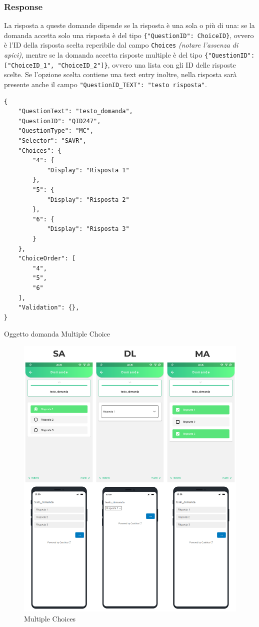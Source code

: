 \subsubsection{Response}
La risposta a queste domande dipende se la risposta è una sola o più di una: se la domanda accetta solo una risposta è del tipo \texttt{\{"QuestionID": ChoiceID\}}, ovvero è l'ID della risposta scelta reperibile dal campo \texttt{Choices} \textit{(notare l'assenza di apici)}, mentre se la domanda accetta risposte multiple è del tipo \texttt{\{"QuestionID": ["ChoiceID\_1", "ChoiceID\_2"]\}}, ovvero una lista con gli ID delle risposte scelte. Se l'opzione scelta contiene una text entry inoltre, nella risposta sarà presente anche il campo \texttt{"QuestionID\_TEXT": "testo risposta"}.

\begin{json}
\begin{verbatim}
{
    "QuestionText": "testo_domanda",
    "QuestionID": "QID247",
    "QuestionType": "MC",
    "Selector": "SAVR",
    "Choices": {
        "4": {
            "Display": "Risposta 1"
        },
        "5": {
            "Display": "Risposta 2"
        },
        "6": {
            "Display": "Risposta 3"
        }
    },
    "ChoiceOrder": [
        "4",
        "5",
        "6"
    ],
    "Validation": {},
}
\end{verbatim}
\caption{Oggetto domanda Multiple Choice}
\label{json:mc}
\end{json}

\begin{figure}[h!]
\centering
\includegraphics[width=\textwidth]{img/mc_flutter}
\caption{Multiple Choices}
\label{fig:mc}
\end{figure}

